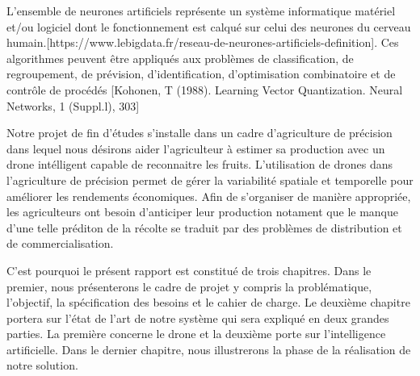 
L'ensemble de neurones artificiels représente un système informatique matériel et/ou logiciel dont le fonctionnement est calqué sur celui des neurones du cerveau humain.[https://www.lebigdata.fr/reseau-de-neurones-artificiels-definition].
Ces algorithmes peuvent être appliqués aux problèmes de classification, de regroupement, de prévision, d'identification, d'optimisation combinatoire et de contrôle de procédés
[Kohonen, T (1988). Learning Vector Quantization. Neural Networks, 1 (Suppl.l),
303]



Notre projet de fin d'études s'installe dans un cadre d'agriculture de précision dans lequel nous désirons aider l'agriculteur à estimer sa production avec un drone intélligent capable de reconnaitre les fruits. L'utilisation de drones dans l'agriculture de précision permet de gérer la variabilité spatiale et temporelle pour améliorer les rendements économiques. Afin de s'organiser de manière appropriée, les agriculteurs ont besoin d'anticiper leur production notament que le manque d'une telle préditon de la récolte se traduit par des problèmes de distribution et de commercialisation.

C'est pourquoi le présent rapport est constitué de trois chapitres. 
Dans le premier, nous présenterons le cadre de projet y compris la problématique, l'objectif, la spécification des besoins et le cahier de charge. 
 Le deuxième chapitre portera sur l'état de l'art de notre système qui sera expliqué en deux grandes parties. La première concerne le drone et la deuxième porte sur l'intelligence artificielle. Dans le dernier chapitre, nous illustrerons la phase de la réalisation de notre solution.
